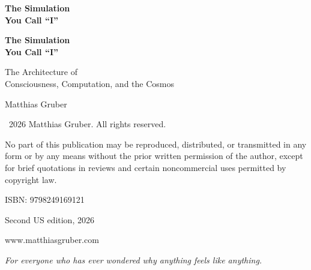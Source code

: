 \documentclass[11pt, twoside, openright]{book}
\makeatletter
\def\cleardoublepage{\clearpage\if@twoside \ifodd\c@page\else
  \thispagestyle{empty}\hbox{}\newpage
  \if@twocolumn\hbox{}\newpage\fi\fi\fi}
\makeatother
\begin{document}
\frontmatter
\pagestyle{empty}

\vspace*{3in}
\begin{center}
{\Huge\bfseries The Simulation\\[0.3cm] You Call ``I''\par}
\end{center}
\cleardoublepage

\vspace*{2in}
\begin{center}
{\Huge\bfseries The Simulation\\[0.3cm] You Call ``I''\par}
\vspace{0.8cm}
{\Large The Architecture of\\[0.2cm] Consciousness, Computation, and the Cosmos\par}
\vspace{2cm}
{\large Matthias Gruber\par}
\end{center}
\clearpage

\thispagestyle{empty}
\vspace*{\fill}
{\small
\noindent \textcopyright\ 2026 Matthias Gruber. All rights reserved.\par
\vspace{0.5cm}
\noindent No part of this publication may be reproduced, distributed, or transmitted
in any form or by any means without the prior written permission of the author,
except for brief quotations in reviews and certain noncommercial uses
permitted by copyright law.\par
\vspace{0.5cm}
\noindent ISBN: 9798249169121\par
\vspace{0.5cm}
\noindent Second US edition, 2026\par
\vspace{0.5cm}
\noindent www.matthiasgruber.com\par
}
\cleardoublepage

\thispagestyle{empty}
\vspace*{3in}
\begin{center}
\textit{For everyone who has ever wondered why anything feels like anything.}
\end{center}
\cleardoublepage
\end{document}
